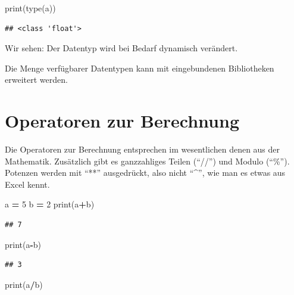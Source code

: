 \documentclass[
]{book}
\newenvironment{Shaded}{\begin{snugshade}}{\end{snugshade}}
\newcommand{\BuiltInTok}[1]{#1}
\newcommand{\DecValTok}[1]{\textcolor[rgb]{0.00,0.00,0.81}{#1}}
\newcommand{\NormalTok}[1]{#1}
\newcommand{\OperatorTok}[1]{\textcolor[rgb]{0.81,0.36,0.00}{\textbf{#1}}}
\begin{document}
\begin{Shaded}
\begin{Highlighting}[]
\BuiltInTok{print}\NormalTok{(}\BuiltInTok{type}\NormalTok{(a))}
\end{Highlighting}
\end{Shaded}

\begin{verbatim}
## <class 'float'>
\end{verbatim}

Wir sehen: Der Datentyp wird bei Bedarf dynamisch verändert.

Die Menge verfügbarer Datentypen kann mit eingebundenen Bibliotheken erweitert werden.

\hypertarget{operatoren-zur-berechnung}{%
\section{Operatoren zur Berechnung}\label{operatoren-zur-berechnung}}

Die Operatoren zur Berechnung entsprechen im wesentlichen denen aus der Mathematik. Zusätzlich gibt es ganzzahliges Teilen (``//'') und Modulo (``\%''). Potenzen werden mit ``**'' ausgedrückt, also nicht ``\^{}'', wie man es etwas aus Excel kennt.

\begin{Shaded}
\begin{Highlighting}[]
\NormalTok{a }\OperatorTok{=} \DecValTok{5}
\NormalTok{b }\OperatorTok{=} \DecValTok{2}
\BuiltInTok{print}\NormalTok{(a}\OperatorTok{+}\NormalTok{b)}
\end{Highlighting}
\end{Shaded}

\begin{verbatim}
## 7
\end{verbatim}

\begin{Shaded}
\begin{Highlighting}[]
\BuiltInTok{print}\NormalTok{(a}\OperatorTok{{-}}\NormalTok{b)}
\end{Highlighting}
\end{Shaded}

\begin{verbatim}
## 3
\end{verbatim}

\begin{Shaded}
\begin{Highlighting}[]
\BuiltInTok{print}\NormalTok{(a}\OperatorTok{/}\NormalTok{b)}
\end{Highlighting}
\end{Shaded}
\end{document}
